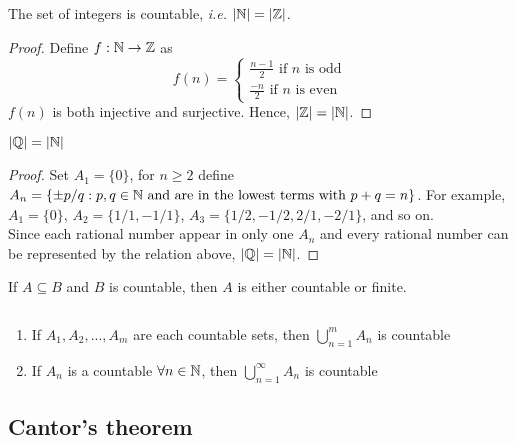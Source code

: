 \begin{theorem}[Countability of $\Z$]
    The set of integers is countable, \emph{i.e.} $|\mathbb{N}| = |\mathbb{Z}|$.
\end{theorem}

\begin{proof}
    Define $f: \mathbb{N} \to \mathbb{Z}$ as
    \begin{equation*}
        f(n) = \begin{cases}
            \frac{n-1}{2} \text{ if } n \text{ is odd} \\
            \frac{-n}{2} \text{ if } n \text{ is even}
        \end{cases}
    \end{equation*}
    $f(n)$ is both injective and surjective. Hence, $|\mathbb{Z}| = |\mathbb{N}|$.
\end{proof}

\begin{theorem}[Countability of $\Q$]
    $|\mathbb{Q}| = |\mathbb{N}|$
\end{theorem}

\begin{proof}
    Set $A_1 = \{0 \}$, for $n \geq 2$ define $A_n = \{ \pm p/q: p,q \in \mathbb{N} \text{ and are in the lowest terms with } p + q = n\}$. For example, $A_1 = \{0\}$, $A_2 =\{ 1/1, -1/1\}$, $A_3 = \{ 1/2, -1/2, 2/1, -2/1\}$, and so on.\\
    Since each rational number appear in only one $A_n$ and every rational number can be represented by the relation above, $|\mathbb{Q}| = |\mathbb{N}|$.
\end{proof}

\begin{theorem}
    If $A \subseteq B$ and $B$ is countable, then $A$ is either countable or finite.
\end{theorem}

\begin{theorem}
    $ $ \newline
    \begin{enumerate}
        \item If $A_1, A_2, ..., A_m$ are each countable sets, then $\bigcup \limits_{n=1}^m A_n$ is countable
        \item If $A_n$ is a countable $\forall n \in \mathbb{N}$, then $\bigcup \limits_{n=1}^\infty A_n$ is countable
    \end{enumerate}
\end{theorem}

\subsection{Cantor's theorem}

